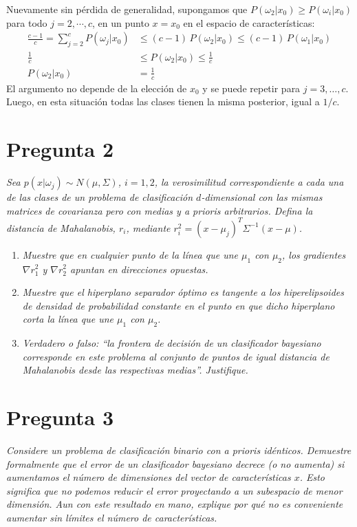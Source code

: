 \documentclass[spanish]{article}
\newcommand{\pregunta}{\textit}
\newcommand{\given}{\vert}
\begin{document}
\begin{enumerate}
        Nuevamente sin pérdida de generalidad, supongamos que $P(\omega_2\given x_0)\ge
        P(\omega_i\given x_0)$ para todo $j = 2, \cdots, c$, en un punto $x = x_0$ en el espacio de
        características:
        \begin{align}
                \frac{c - 1}{c} = \sum_{j=2}^c P(\omega_j\given x_0) 
                &\le (c - 1)\,P(\omega_2\given x_0) \le (c - 1)\,P(\omega_1\given x_0) \\
                \frac{1}{c} &\le P(\omega_2\given x_0) \le \frac{1}{c} \\
                P(\omega_2\given x_0) &= \frac{1}{c}
        \end{align}
        El argumento no depende de la elección de $x_0$ y se puede repetir para $j = 3,\ldots, c$.
        Luego, en esta situación todas las clases tienen la misma posterior, igual a $1/c$.
\end{enumerate}

\section*{Pregunta 2}
\pregunta{
    Sea $p(x\given\omega_j)\sim N(\mu, \Sigma)$, $i = 1, 2$, la verosimilitud correspondiente a cada
    una de las clases de un problema de clasificación $d$-dimensional con las mismas matrices de
    covarianza pero con medias y a prioris arbitrarios.  Defina la distancia de Mahalanobis, $r_i$,
    mediante $r_i^2 = (x - \mu_j)^T \Sigma^{-1} (x - \mu)$.
}
\begin{enumerate}
    \item \pregunta{Muestre que en cualquier punto de la línea que une $\mu_1$ con $\mu_2$, los
        gradientes $\nabla r_1^2$ y $\nabla r_2^2$ apuntan en direcciones opuestas.}

    \item \pregunta{Muestre que el hiperplano separador óptimo es tangente a los hiperelipsoides de
        densidad de probabilidad constante en el punto en que dicho hiperplano corta la línea que une 
        $\mu_1$ con $\mu_2$.}

    \item \pregunta{Verdadero o falso: ``la frontera de decisión de un clasificador bayesiano
        corresponde en este problema al conjunto de puntos de igual distancia de Mahalanobis desde
        las respectivas medias''.  Justifique.}
\end{enumerate}

\section*{Pregunta 3}
\pregunta{Considere un problema de clasificación binario con a prioris idénticos. Demuestre
    formalmente que el error de un clasificador bayesiano decrece (o no aumenta) si aumentamos el
    número de dimensiones del vector de características $x$.  Esto significa que no podemos reducir
    el error proyectando a un subespacio de menor dimensión.  Aun con este resultado en mano,
    explique por qué no es conveniente aumentar sin límites el número de características.}
\end{document}
